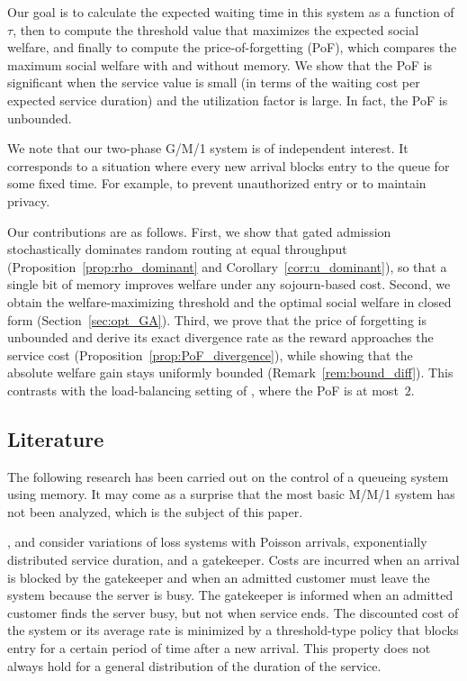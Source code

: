 \documentclass[11pt]{article}
\begin{document}
Our goal is to calculate the expected waiting time in this system as a function of $\tau$, then to compute the threshold value that maximizes the expected social welfare, and finally to compute the price-of-forgetting (PoF), which compares the maximum social welfare with and without memory.  We show that the PoF is significant when the service value is small (in terms of the waiting cost per expected service duration) and the utilization factor is large.  In fact, the PoF is unbounded.

We note that our two-phase G/M/1 system is of independent interest.  It corresponds to a situation where every new arrival blocks entry to the queue for some fixed time.  For example, to prevent unauthorized entry or to maintain privacy.

Our contributions are as follows. First, we show that gated admission stochastically dominates random routing at equal throughput (Proposition~\ref{prop:rho_dominant} and Corollary~\ref{corr:u_dominant}), so that a single bit of memory improves welfare under any sojourn-based cost. Second, we obtain the welfare-maximizing threshold and the optimal social welfare in closed form (Section~\ref{sec:opt_GA}). Third, we prove that the price of forgetting is unbounded and derive its exact divergence rate as the reward approaches the service cost (Proposition~\ref{prop:PoF_divergence}), while showing that the absolute welfare gain stays uniformly bounded (Remark~\ref{rem:bound_diff}). This contrasts with the load-balancing setting of \citet{AG11}, where the PoF is at most~$2$.

\subsection{Literature}

The following research has been carried out on the control of a queueing system using memory.   It may come as a surprise that the most basic M/M/1 system has not been analyzed, which is the subject of this paper.

\citet{Lin03}, \citet{LR03, LR04} and \citet{HS07} consider variations of loss systems with Poisson arrivals, exponentially distributed service duration, and a gatekeeper. Costs are incurred when an arrival is blocked by the gatekeeper and when an admitted customer
must leave the system because the server is busy. The gatekeeper is informed when an admitted customer
finds the server busy, but not when service ends. The discounted cost of the system or its average rate is minimized by a threshold-type policy that blocks entry for a certain period of time after a new arrival.  This property does not always hold for a general distribution of the duration of the service.
\end{document}
